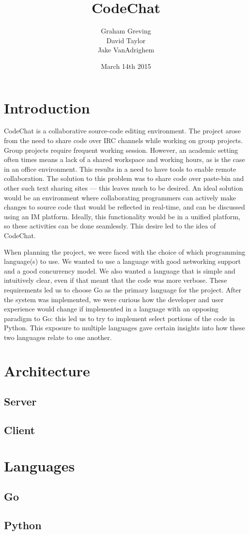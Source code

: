 \documentclass[10pt, letterpaper]{article}
\title{CodeChat}
\author{Graham Greving \\ David Taylor \\ Jake VanAdrighem}
\date{March 14th 2015}
\begin{document}
\maketitle

\section*{Introduction}

CodeChat is a collaborative source-code editing environment. The project
arose from the need to share code over IRC channels while working on group 
projects. Group projects require frequent working session. However, an
academic setting often times means a lack of a shared workspace and
working hours, as is the case in an office environment. This results in
a need to have tools to enable remote collaboration.
The solution to this problem was to share code over paste-bin and other
such text sharing sites --- this leaves much to be desired. An ideal
solution would be an environment where collaborating programmers can
actively make changes to source code that would be reflected in
real-time, and can be discussed using an IM platform. Ideally, this
functionality would be in a unified platform, so these activities
can be done seamlessly. This desire led to the idea of CodeChat.

When planning the project, we were faced with the choice of which
programming language(s) to use. We wanted to use a language with
good networking support and a good concurrency model. We also
wanted a language that is simple and intuitively clear, even if
that meant that the code was more verbose. These requirements led
us to choose Go as the primary language for the project. After
the system was implemented, we were curious how the developer and
user experience would change if implemented in a language with
an opposing paradigm to Go: this led us to try to implement
select portions of the code in Python. This exposure to multiple
languages gave certain insights into how these two languages relate
to one another.

\section*{Architecture}

\subsection*{Server}

\subsection*{Client}

\section*{Languages}

\subsection*{Go}

\subsection*{Python}
\end{document}
